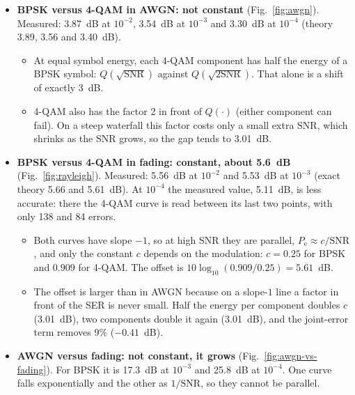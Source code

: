 \documentclass[11pt,a4paper]{article}
\newcommand{\snr}{\mathrm{SNR}}
\newcommand{\Pe}{P_{\mathrm{e}}}
\begin{document}
\begin{itemize}
  \item \textbf{BPSK versus 4-QAM in AWGN: not constant} (Fig.~\ref{fig:awgn}).
        Measured: 3.87~dB at $10^{-2}$, 3.54~dB at $10^{-3}$ and 3.30~dB at
        $10^{-4}$ (theory 3.89, 3.56 and 3.40~dB).
        \begin{itemize}
          \item At equal symbol energy, each 4-QAM component has half the energy of a
                BPSK symbol: $Q(\sqrt{\snr})$ against $Q(\sqrt{2\snr})$. That alone is
                a shift of exactly 3~dB.
          \item 4-QAM also has the factor 2 in front of $Q(\cdot)$ (either component can
                fail). On a steep waterfall this factor costs only a small extra SNR,
                which shrinks as the SNR grows, so the gap tends to 3.01~dB.
        \end{itemize}
  \item \textbf{BPSK versus 4-QAM in fading: constant, about 5.6~dB}
        (Fig.~\ref{fig:rayleigh}). Measured: 5.56~dB at $10^{-2}$ and 5.53~dB at
        $10^{-3}$ (exact theory 5.66 and 5.61~dB). At $10^{-4}$ the measured value,
        5.11~dB, is less accurate: there the 4-QAM curve is read between its last two
        points, with only 138 and 84 errors.
        \begin{itemize}
          \item Both curves have slope $-1$, so at high SNR they are parallel,
                $\Pe \approx c/\snr$, and only the constant $c$ depends on the
                modulation: $c = 0.25$ for BPSK and $0.909$ for 4-QAM. The offset is
                $10\log_{10}(0.909/0.25) = 5.61$~dB.
          \item The offset is larger than in AWGN because on a slope-$1$ line a factor
                in front of the SER is never small. Half the energy per component
                doubles $c$ (3.01~dB), two components double it again (3.01~dB), and
                the joint-error term removes 9\% ($-0.41$~dB).
        \end{itemize}
  \item \textbf{AWGN versus fading: not constant, it grows}
        (Fig.~\ref{fig:awgn-vs-fading}). For BPSK it is 17.3~dB at $10^{-3}$ and
        25.8~dB at $10^{-4}$. One curve falls exponentially and the other as
        $1/\snr$, so they cannot be parallel.
\end{itemize}

\end{document}
